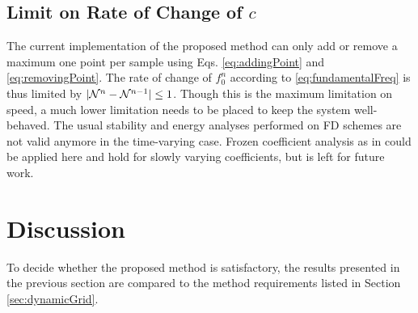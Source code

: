 \subsection{Limit on Rate of Change of $c$}
The current implementation of the proposed method can only add or remove a maximum one point per sample using Eqs. \eqref{eq:addingPoint} and \eqref{eq:removingPoint}. The rate of change of $f_0^n$ according to \eqref{eq:fundamentalFreq} is thus limited by $|\mathcal{N}^n - \mathcal{N}^{n-1}| \leq 1$. Though this is the maximum limitation on speed, a much lower limitation needs to be placed to keep the system well-behaved. The usual stability and energy analyses performed on FD schemes are not valid anymore in the time-varying case. Frozen coefficient analysis as in \cite{Strikwerda1989} could be applied here and hold for slowly varying coefficients, but is left for future work. 


\section{Discussion}\label{sec:discussion}
To decide whether the proposed method is satisfactory, the results presented in the previous section are compared to the method requirements listed in Section \ref{sec:dynamicGrid}.%

